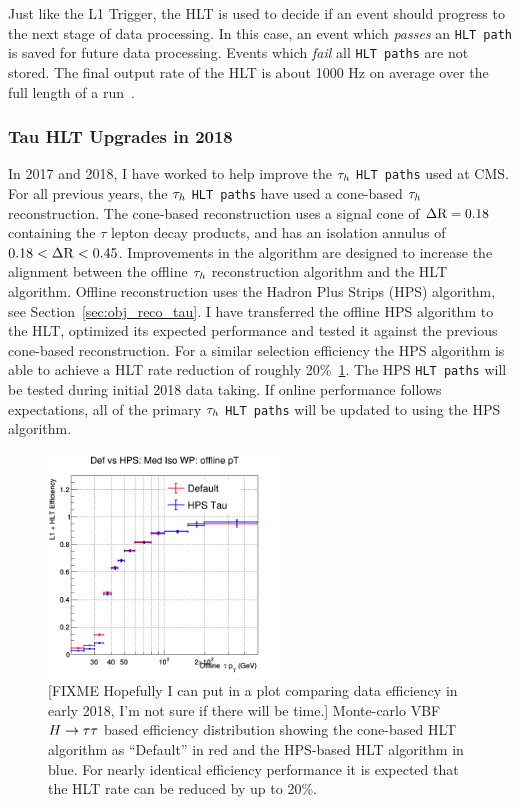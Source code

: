 Just like the L1 Trigger, the HLT is used to decide if an event should progress
to the next stage of data processing. In this case, an event which \textit{passes}
an \texttt{HLT path} is saved for future data processing. Events which \textit{fail}
all \texttt{HLT paths} are not stored. The final output rate of the HLT is
about 1000 Hz on average over the full length of a run~\cite{cms_daq_7097437}.



\subsubsection{Tau HLT Upgrades in 2018}
In 2017 and 2018, I have worked to help improve the $\tau_{h}$ \texttt{HLT paths} 
used at CMS. For all previous years, the $\tau_{h}$ \texttt{HLT paths} have used
a cone-based $\tau_{h}$ reconstruction. The cone-based reconstruction 
uses a signal cone of $\Delta \mathrm{R} = 0.18$ containing the $\tau$ lepton decay products,
and has an isolation annulus of $0.18 < \Delta \mathrm{R} < 0.45$. Improvements in the
algorithm are designed to increase the alignment between the offline $\tau_{h}$
reconstruction algorithm and the HLT algorithm. Offline reconstruction uses
the Hadron Plus Strips (HPS) algorithm, see Section~\ref{sec:obj_reco_tau}.
I have transferred the offline HPS algorithm to the HLT, optimized its expected
performance and tested it against the previous cone-based reconstruction. For a similar
selection efficiency the HPS algorithm is able to achieve a HLT rate
reduction of roughly 20\%~\ref{fig:hlt_hps}. The HPS \texttt{HLT paths}
will be tested during initial 2018 data taking. If online performance
follows expectations, all of the primary $\tau_{h}$ \texttt{HLT paths}
will be updated to using the HPS algorithm.

\begin{figure}[htbp]
\centering
     \includegraphics[width=0.55\textwidth]{cms_and_lhc/plots/eff_Def_vs_HPS_Med_Iso_WP_offline_pT.png}
     \caption{
[FIXME Hopefully I can put in a plot comparing data efficiency in early 2018, I'm not sure if there
will be time.]
Monte-carlo VBF $H\to\tau\tau$ based efficiency distribution showing the cone-based HLT
algorithm as ``Default'' in red and the HPS-based HLT algorithm
in blue. For nearly identical efficiency performance it is expected that
the HLT rate can be reduced by up to 20\%. 
     }
     \label{fig:hlt_hps}
\end{figure}


